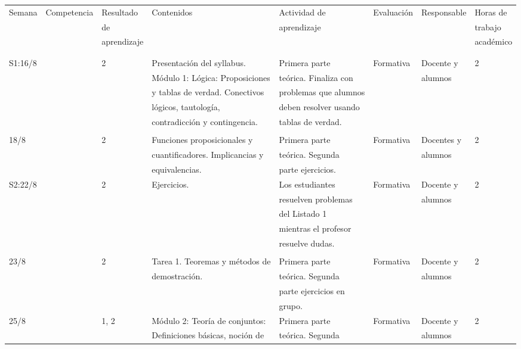 \documentclass[11pt]{article}
\begin{document}
{\scriptsize
\begin{center}
\begin{longtable}{|l|l|l|l|l|l|l|l|}
\hline
Semana & Competencia & Resultado & Contenidos & Actividad de & Evaluación & Responsable & Horas de \\
 & & de & & aprendizaje & & & trabajo \\
 & & aprendizaje & & & & & académico \\
 & & & & & & & \\
 & & & & & & & \\
\hline
S1:16/8 & & 2 & Presentación del syllabus. & Primera parte & Formativa & Docente y & 2 \\
 & & & Módulo 1: Lógica: Proposiciones & teórica. Finaliza con & & alumnos & \\
 & & & y tablas de verdad. Conectivos & problemas que alumnos & & & \\
 & & & lógicos, tautología, & deben resolver usando & & & \\
 & & & contradicción y contingencia. & tablas de verdad. & & & \\
 & & & & & & & \\
\hline
18/8 & & 2 & Funciones proposicionales y & Primera parte & Formativa & Docentes y & 2 \\
 & & & cuantificadores. Implicancias y & teórica. Segunda & & alumnos & \\
 & & & equivalencias. & parte ejercicios. & & & \\
\hline
S2:22/8 & & 2 & Ejercicios. & Los estudiantes & Formativa & Docente y & 2 \\
 & & & & resuelven problemas & & alumnos & \\
 & & & & del Listado 1 & & & \\
 & & & & mientras el profesor & & & \\
 & & & & resuelve dudas. & & & \\
 & & & & & & & \\
\hline
23/8 & & 2 & Tarea 1. Teoremas y métodos de & Primera parte & Formativa & Docente y & 2 \\
 & & & demostración. & teórica. Segunda & & alumnos & \\
 & & & & parte ejercicios en & & & \\
 & & & & grupo. & & & \\
\hline
25/8 & & 1, 2 & Módulo 2: Teoría de conjuntos: & Primera parte & Formativa & Docente y & 2 \\
 & & & Definiciones básicas, noción de & teórica. Segunda & & alumnos & \\

\end{longtable}
\end{center}}
\end{document}

